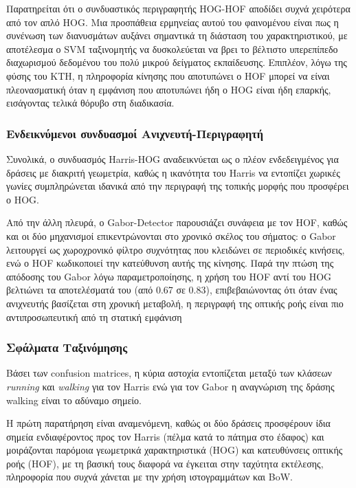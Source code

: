 \documentclass[12pt]{article}
\begin{document}
Παρατηρείται ότι ο συνδυαστικός περιγραφητής HOG-HOF αποδίδει συχνά χειρότερα από τον απλό HOG. Μια προσπάθεια ερμηνείας αυτού του φαινομένου είναι πως η συνένωση των διανυσμάτων αυξάνει σημαντικά τη διάσταση του χαρακτηριστικού, με αποτέλεσμα ο SVM ταξινομητής να δυσκολεύεται να βρει το βέλτιστο υπερεπίπεδο διαχωρισμού δεδομένου του πολύ μικρού δείγματος εκπαίδευσης. Επιπλέον, λόγω της φύσης του KTH, η πληροφορία κίνησης που αποτυπώνει ο HOF μπορεί να είναι πλεονασματική όταν η εμφάνιση που αποτυπώνει ήδη ο HOG είναι ήδη επαρκής, εισάγοντας τελικά θόρυβο στη διαδικασία.

\subsubsection*{Ενδεικνύμενοι συνδυασμοί Ανιχνευτή-Περιγραφητή}
\hspace{0.6cm}Συνολικά, ο συνδυασμός Harris-HOG αναδεικνύεται ως ο πλέον ενδεδειγμένος για δράσεις με διακριτή γεωμετρία, καθώς η ικανότητα του Harris να εντοπίζει χωρικές γωνίες συμπληρώνεται ιδανικά από την περιγραφή της τοπικής μορφής που προσφέρει ο HOG. 

Από την άλλη πλευρά, ο Gabor-Detector παρουσιάζει συνάφεια με τον HOF, καθώς και οι δύο μηχανισμοί επικεντρώνονται στο χρονικό σκέλος του σήματος: ο Gabor λειτουργεί ως χωροχρονικό φίλτρο συχνότητας που κλειδώνει σε περιοδικές κινήσεις, ενώ ο HOF κωδικοποιεί την κατεύθυνση αυτής της κίνησης. Παρά την πτώση της απόδοσης του Gabor λόγω παραμετροποίησης, η χρήση του HOF αντί του HOG βελτιώνει τα αποτελέσματά του (από 0.67 σε 0.83), επιβεβαιώνοντας ότι όταν ένας ανιχνευτής βασίζεται στη χρονική μεταβολή, η περιγραφή της οπτικής ροής είναι πιο αντιπροσωπευτική από τη στατική εμφάνιση

\subsubsection*{Σφάλματα Ταξινόμησης}
Βάσει των confusion matrices, η κύρια αστοχία εντοπίζεται μεταξύ των κλάσεων \textit{running} και \textit{walking} για τον Harris ενώ για τον Gabor η αναγνώριση της δράσης walking είναι το αδύναμο σημείο. 

Η πρώτη παρατήρηση είναι αναμενόμενη, καθώς οι δύο δράσεις προσφέρουν ίδια σημεία ενδιαφέροντος προς τον Harris (πέλμα κατά το πάτημα στο έδαφος) και μοιράζονται παρόμοια γεωμετρικά χαρακτηριστικά (HOG) και κατευθύνσεις οπτικής ροής (HOF), με τη βασική τους διαφορά να έγκειται στην ταχύτητα εκτέλεσης, πληροφορία που συχνά χάνεται με την χρήση ιστογραμμάτων και BoW.
\end{document}
